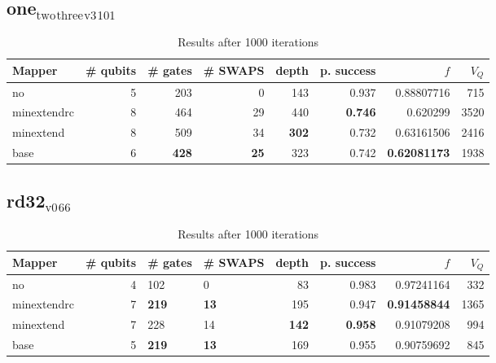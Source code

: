 \documentclass[11pt]{article}
\begin{document}
\subsection{one\(_{\text{two}}\)\(_{\text{three}}\)\(_{\text{v3}}\)\(_{\text{101}}\)}
\label{sec:org82f5c8f}
\begin{table}[H]
\caption{\label{tab:orgff772a6}
Results after 1000 iterations}
\centering
\small
\begin{tabular}{lrrrrrrr}
\hline
Mapper & \# qubits & \# gates & \# SWAPS & depth & p. success & \(f\) & \(V_Q\)\\
\hline
no & 5 & 203 & 0 & 143 & 0.937 & 0.88807716 & 715\\
\hline
minextendrc & 8 & 464 & 29 & 440 & \textbf{0.746} & 0.620299 & 3520\\
minextend & 8 & 509 & 34 & \textbf{302} & 0.732 & 0.63161506 & 2416\\
base & 6 & \textbf{428} & \textbf{25} & 323 & 0.742 & \textbf{0.62081173} & 1938\\
\hline
\end{tabular}
\end{table}
\subsection{rd32\(_{\text{v0}}\)\(_{\text{66}}\)}
\label{sec:org968fb34}
\begin{table}[H]
\caption{\label{tab:org7c9bbe6}
Results after 1000 iterations}
\centering
\small
\begin{tabular}{lrllrrrr}
\hline
Mapper & \# qubits & \# gates & \# SWAPS & depth & p. success & \(f\) & \(V_Q\)\\
\hline
no & 4 & 102 & 0 & 83 & 0.983 & 0.97241164 & 332\\
\hline
minextendrc & 7 & \textbf{219} & \textbf{13} & 195 & 0.947 & \textbf{0.91458844} & 1365\\
minextend & 7 & 228 & 14 & \textbf{142} & \textbf{0.958} & 0.91079208 & 994\\
base & 5 & \textbf{219} & \textbf{13} & 169 & 0.955 & 0.90759692 & 845\\
\hline
\end{tabular}
\end{table}
\end{document}
